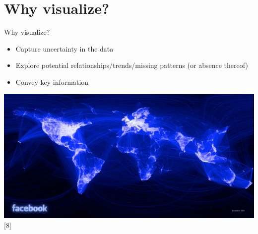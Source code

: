 \section{Why visualize?}
\begin{frame}
	\begin{center}
  		\begin{block}{Why visualize?} 
			\begin{itemize}
				\item \small Capture uncertainty in the data
				\item Explore potential relationships/trends/missing patterns (or absence thereof)
				\item Convey key information \normalfont
			\end{itemize}		
		\end{block}
	\end{center} 

   \begin{center}
     \includegraphics[scale=0.09]{images/facebook}[8]
    \end{center}

\end{frame}

